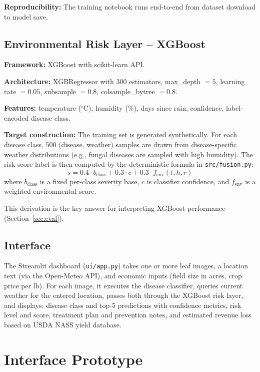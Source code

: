 \documentclass[conference]{IEEEtran}
\begin{document}
\textbf{Reproducibility:} The training notebook runs end-to-end from dataset download to model save.
\subsection{Environmental Risk Layer -- XGBoost}

\textbf{Framework:} XGBoost with scikit-learn API.

\textbf{Architecture:} XGBRegressor with 300 estimators, max\_depth $= 5$, learning rate $= 0.05$, subsample $= 0.8$, colsample\_bytree $= 0.8$.

\textbf{Features:} temperature ($^\circ$C), humidity (\%), days since rain, confidence, label-encoded disease class.

\textbf{Target construction:} The training set is generated synthetically. For each disease class, 500 (disease, weather) samples are drawn from disease-specific weather distributions (e.g., fungal diseases are sampled with high humidity). The risk score label is then computed by the deterministic formula in \texttt{src/fusion.py}:
\begin{equation}
  s = 0.4 \cdot b_\text{class} + 0.3 \cdot c + 0.3 \cdot f_\text{env}(t, h, r)
  \label{eq:risk}
\end{equation}
where $b_\text{class}$ is a fixed per-class severity base, $c$ is classifier confidence, and $f_\text{env}$ is a weighted environmental score.

This derivation is the key answer for interpreting XGBoost performance (Section~\ref{sec:eval}).

\subsection{Interface}
The Streamlit dashboard (\texttt{ui/app.py}) takes one or more leaf images, a location text (via the Open-Meteo API), and economic inputs (field size in acres, crop price per lb). For each image, it executes the disease classifier, queries current weather for the entered location, passes both through the XGBoost risk layer, and displays: disease class and top-5 predictions with confidence metrics, risk level and score, treatment plan and prevention notes, and estimated revenue loss based on USDA NASS yield database.

\section{Interface Prototype}
\end{document}
